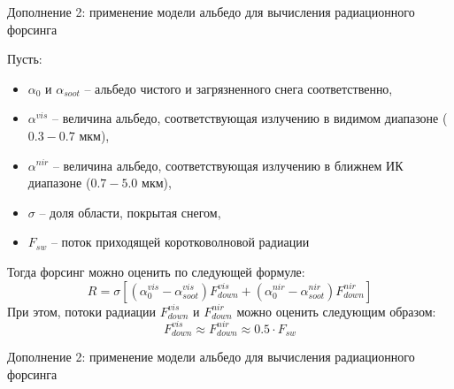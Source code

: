 \documentclass[unicode]{beamer}
\begin{document}
\begin{frame}{Дополнение 2: применение модели альбедо для вычисления радиационного форсинга}

\footnotesize
Пусть:
\begin{itemize}
    \item $\alpha_{0}$ и $\alpha_{soot}$ -- альбедо чистого и загрязненного снега соответственно,
    \item $\alpha^{vis}$ -- величина альбедо, соответствующая излучению в видимом диапазоне ($0.3-0.7$ мкм),
    \item $\alpha^{nir}$ -- величина альбедо, соответствующая излучению в ближнем ИК диапазоне ($0.7-5.0$ мкм),
    \item $\sigma$ -- доля области, покрытая снегом,
    \item $F_{sw}$ -- поток приходящей коротковолновой радиации
\end{itemize}
Тогда форсинг можно оценить по следующей формуле:
    \[ R = \sigma [ (\alpha_{0}^{vis} - \alpha_{soot}^{vis})F_{down}^{vis} + (\alpha_{0}^{nir} - \alpha_{soot}^{nir})F_{down}^{nir} ] \]
При этом, потоки радиации $F_{down}^{vis}$ и $F_{down}^{nir}$ можно оценить следующим образом: 
\[ F_{down}^{vis} \approx F_{down}^{nir} \approx 0.5 \cdot F_{sw} \]
    
\end{frame}



\begin{frame}{Дополнение 2: применение модели альбедо для вычисления радиационного форсинга}

\scriptsize
\begin{figure}[h]
\end{figure}

\end{frame}
\end{document}
